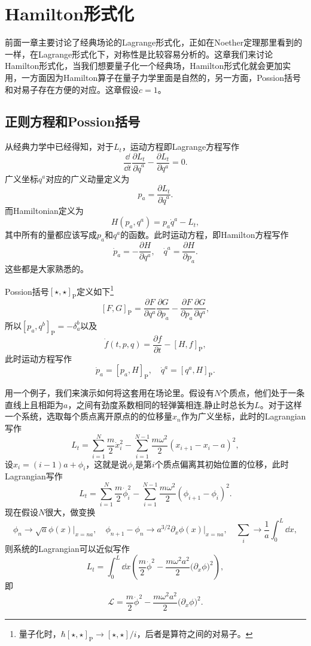 
\chapter{Hamilton形式化}
前面一章主要讨论了经典场论的Lagrange形式化，正如在Noether定理那里看到的一样，在Lagrange形式化下，对称性是比较容易分析的。这章我们来讨论Hamilton形式化，当我们想要量子化一个经典场，Hamilton形式化就会更加实用，一方面因为Hamilton算子在量子力学里面是自然的，另一方面，Possion括号和对易子存在方便的对应。这章假设$c=1$。
\section{正则方程和Possion括号}
从经典力学中已经得知，对于$L_t$，运动方程即Lagrange方程写作
\[
	\frac{\dd}{\dd t}\frac{\partial L_t}{\partial \dot{q}^a}-\frac{\partial L_t}{\partial q^a}=0.
\]
广义坐标$q^a$对应的广义动量定义为
\[
	p_a=\frac{\partial L_t}{\partial \dot{q}^a}.
\]
而Hamiltonian定义为
\[
	H(p_a,q^a)=p_a \dot{q}^a-L_t,
\]
其中所有的量都应该写成$p_a$和$q^a$的函数。此时运动方程，即Hamilton方程写作
\[
	\dot{p}_a=-\frac{\partial H}{\partial q^a},\quad \dot{q}^a=\frac{\partial H}{\partial p_a}.
\]
这些都是大家熟悉的。

Possion括号$[\star,\star]_{\mathrm{P}}$定义如下\footnote{量子化时，$\hbar [\star,\star]_{\mathrm{P}}\to [\star,\star]/i$，后者是算符之间的对易子。}
\[
	[F,G]_{\mathrm{P}}=\frac{\partial F}{\partial q^a}\frac{\partial G}{\partial p_a}-\frac{\partial F}{\partial p_a}\frac{\partial G}{\partial q^a},
\]
所以$[p_a,q^b]_{\mathrm{P}}=-\delta_a^b$以及
\[
	\dot{f}(t,p,q)=\frac{\partial f}{\partial t}-[H,f]_{\mathrm{P}},
\]
此时运动方程写作
\[
	\dot{p}_a=[p_a,H]_{\mathrm{P}},\quad \dot{q}^a=[q^a,H]_{\mathrm{P}}.
\]

用一个例子，我们来演示如何将这套用在场论里。假设有$N$个质点，他们处于一条直线上且相距为$a$，之间有劲度系数相同的轻弹簧相连,静止时总长为$L$。对于这样一个系统，选取每个质点离开原点的的位移量$x_n$作为广义坐标，此时的Lagrangian写作
\[
	L_t=\sum_{i=1}^N \frac{m}{2}\dot{x}_i^2-\sum_{i=1}^{N-1}\frac{m\omega^2}{2}(x_{i+1}-x_i-a)^2,
\]
设$x_i=(i-1)a+\phi_i$，这就是说$\phi_i$是第$i$个质点偏离其初始位置的位移，此时Lagrangian写作
\[
	L_t=\sum_{i=1}^N \frac{m}{2}\dot{\phi}_i^2-\sum_{i=1}^{N-1}\frac{m\omega^2}{2}(\phi_{i+1}-\phi_i)^2.
\]
现在假设$N$很大，做变换
\[
	\phi_n\to \sqrt{a}\phi(x)\bigr|_{x=na},\quad \phi_{n+1}-\phi_n\to a^{3/2}\partial_x \phi(x)\bigr|_{x=na},\quad \sum_{i}\to \frac{1}{a}\int_0^L \dd x,
\]
则系统的Lagrangian可以近似写作
\[
	L_t=\int_0^L \dd x\left(\frac{m}{2}\dot{\phi}^2-\frac{m\omega^2a^2}{2}\bigl(\partial_x \phi\bigr)^2\right),
\]
即
\begin{equation}
	\mathcal{L}=\frac{m}{2}\dot{\phi}^2-\frac{m\omega^2a^2}{2}\bigl(\partial_x \phi\bigr)^2.
	\label{c2:1}
\end{equation}

